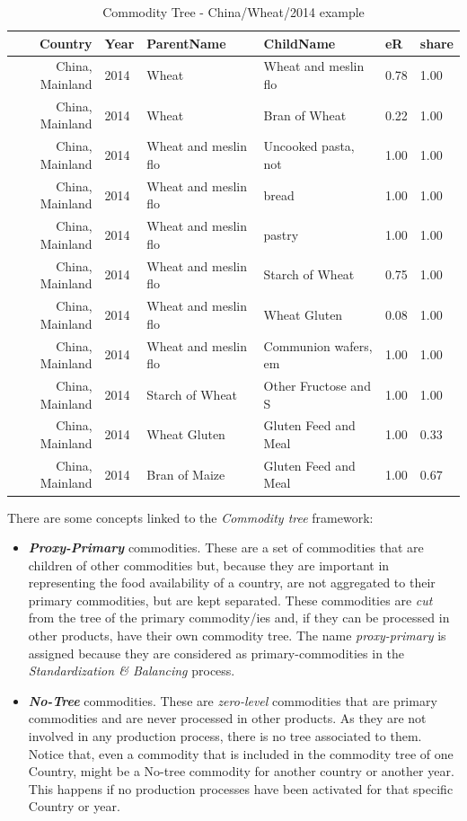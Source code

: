\documentclass[]{article}
\providecommand{\tightlist}{%
  \setlength{\itemsep}{0pt}\setlength{\parskip}{0pt}}
\begin{document}
\begin{table}

\caption{\label{tab:t15}Commodity Tree - China/Wheat/2014 example}
\centering
\begin{tabular}[t]{r|l|l|l|l|l}
\hline
Country & Year & ParentName & ChildName & eR & share\\
\hline
China, Mainland & 2014 & Wheat & Wheat and meslin flo & 0.78 & 1.00\\
\hline
China, Mainland & 2014 & Wheat & Bran of Wheat & 0.22 & 1.00\\
\hline
China, Mainland & 2014 & Wheat and meslin flo & Uncooked pasta, not & 1.00 & 1.00\\
\hline
China, Mainland & 2014 & Wheat and meslin flo & bread & 1.00 & 1.00\\
\hline
China, Mainland & 2014 & Wheat and meslin flo & pastry & 1.00 & 1.00\\
\hline
China, Mainland & 2014 & Wheat and meslin flo & Starch of Wheat & 0.75 & 1.00\\
\hline
China, Mainland & 2014 & Wheat and meslin flo & Wheat Gluten & 0.08 & 1.00\\
\hline
China, Mainland & 2014 & Wheat and meslin flo & Communion wafers, em & 1.00 & 1.00\\
\hline
China, Mainland & 2014 & Starch of Wheat & Other Fructose and S & 1.00 & 1.00\\
\hline
China, Mainland & 2014 & Wheat Gluten & Gluten Feed and Meal & 1.00 & 0.33\\
\hline
China, Mainland & 2014 & Bran of Maize & Gluten Feed and Meal & 1.00 & 0.67\\
\hline
\end{tabular}
\end{table}

There are some concepts linked to the \emph{Commodity tree} framework:

\begin{itemize}
\tightlist
\item
  \textbf{\emph{Proxy-Primary}} commodities. These are a set of
  commodities that are children of other commodities but, because they
  are important in representing the food availability of a country, are
  not aggregated to their primary commodities, but are kept separated.
  These commodities are \emph{cut} from the tree of the primary
  commodity/ies and, if they can be processed in other products, have
  their own commodity tree. The name \emph{proxy-primary} is assigned
  because they are considered as primary-commodities in the
  \emph{Standardization \& Balancing} process.
\item
  \textbf{\emph{No-Tree}} commodities. These are \emph{zero-level}
  commodities that are primary commodities and are never processed in
  other products. As they are not involved in any production process,
  there is no tree associated to them. Notice that, even a commodity
  that is included in the commodity tree of one Country, might be a
  No-tree commodity for another country or another year. This happens if
  no production processes have been activated for that specific Country
  or year.
\end{itemize}
\end{document}
